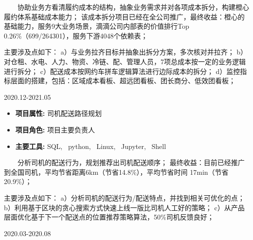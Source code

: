 \documentclass{resume}
\begin{document}
{    \ \ \ \ 
协助业务方看清履约成本的结构，抽象业务需求并对各项成本拆分，构建橙心履约体系基础成本能力；
该成本拆分项目已经在全公司推广，最终收益：橙心的基础能力，服务9大业务场景，滴滴公司内部表的价值排行Top 0.26\%（699/264301），服务下游4048个依赖表；

主要涉及点如下：
a）与业务拉齐目标并抽象出拆分方案，多次核对并拉齐；
b）对仓租、水电、人力、物资、冷链、配、管理人员，7项总成本按一定的业务逻辑进行拆分；
c）配送成本按网约车拼车逻辑算法进行边际成本的拆分；
d）监控指标层面的搭建，包括：区域成本看板、超远团看板、团长商分、低效团看板；


\medskip















                      {2020.12-2021.05}

\begin{itemize}  [parsep=0.5ex]

  \item   \textbf{  项目属性:  }   { 司机配送路径规划 } 
  \item   \textbf{  项目角色:  }   {  项目主要负责人 } 
  \item   \textbf{  主要工具:  }   {  SQL, \ python, \ Linux, \ Jupyter, \ Shell }

\end{itemize}


{    \ \ \ \ 
分析司机的配送行为，规划推荐出司机配送顺序；
最终收益：目前已经推广到全国司机，平均节省距离6km（节省14.8\%），平均节省时间 17min（节省20.9\%）；


主要涉及点如下：
a）分析司机的配送行为/配送特点，并找到相关可优化的点；
b）利用基于区块的贪心搜索方式快速上线一版比司机人工好的策略；
c）从产品层面优化基于下一个配送点的位置推荐策略算法，50\%司机反馈良好；


\medskip













                      {2020.03-2020.08}

\begin{itemize}  [parsep=0.5ex]


\end{itemize}}}
\end{document}

